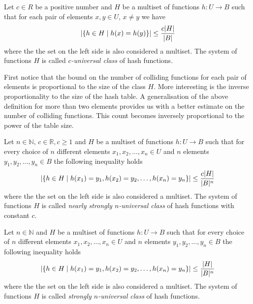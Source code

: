 \begin{definition}
\label{c_universal_system}
Let $c \in R$ be a positive number and $H$ be a multiset of functions $h: U \rightarrow B$ such that for each pair of elements $x, y \in U$, $x \neq y$ we have 
\[ 
	\left| \lbrace h \in H \mid h(x) = h(y) \rbrace \right| \leq \frac {c |H|}{|B|}
\] 
where the the set on the left side is also considered a multiset. The system of functions $H$ is called \emph{$c$-universal class} of hash functions.
\end{definition}

First notice that the bound on the number of colliding functions for each pair of elements is proportional to the size of the class $H$. More interesting is the inverse proportionality to the size of the hash table. A generalisation of the above definition for more than two elements provides us with a better estimate on the number of colliding functions. This count becomes inversely proportional to the power of the table size.

\begin{definition}
\label{nearly_strong_universal_n_system}
Let $n \in \mathbb{N}$, $c \in \mathbb{R}, c \geq 1$ and $H$ be a multiset of functions $h: U \rightarrow B$ such that for every choice of $n$ different elements $x_1, x_2, \dots, x_n \in U$ and $n$ elements $y_1, y_2, \dots, y_n \in B$ the following inequality holds
\[ 
	\left|\lbrace h \in H \mid h(x_1) = y_1, h(x_2) = y_2, \dots, h(x_n) = y_n \rbrace \right| \leq \frac{c|H|}{|B|^n}
\] 
where the the set on the left side is also considered a multiset. The system of functions $H$ is called \emph{nearly strongly $n$-universal class} of hash functions with constant $c$.
\end{definition}

\begin{definition}
\label{strong_universal_n_system}
Let $n \in \mathbb{N}$ and $H$ be a multiset of functions $h: U \rightarrow B$ such that for every choice of $n$ different elements $x_1, x_2, \dots, x_n \in U$ and $n$ elements $y_1, y_2, \dots, y_n \in B$ the following inequality holds
\[ 
	\left|\lbrace h \in H \mid h(x_1) = y_1, h(x_2) = y_2, \dots, h(x_n) = y_n \rbrace \right| \leq \frac{|H|}{|B|^n}
\] 
where the the set on the left side is also considered a multiset. The system of functions $H$ is called \emph{strongly $n$-universal class} of hash functions.
\end{definition}

